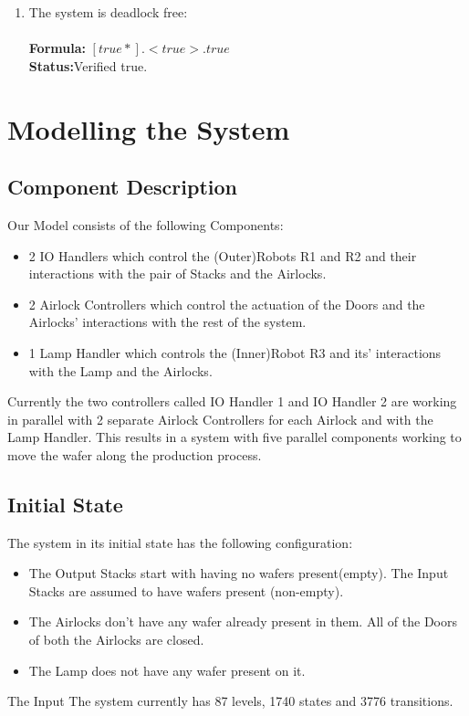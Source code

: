 \documentclass[a4paper,12pt]{article}
\begin{document}
\begin{enumerate}

\item The system is deadlock free:
\\
\\\textbf{Formula:} $[true*].<true>.true$
\\\textbf{Status:}Verified true.

\end{enumerate}

\newpage
\section{Modelling the System}
\subsection{Component Description}
Our Model consists of the following Components:
\begin{itemize}
    \item 2 IO Handlers which control the (Outer)Robots R1 and R2 and their interactions with the pair of Stacks and the Airlocks.
    \item 2 Airlock Controllers which control the actuation of the Doors and the Airlocks' interactions with the rest of the system.
    \item 1 Lamp Handler which controls the (Inner)Robot R3 and its' interactions with the Lamp and the Airlocks.
\end{itemize}
Currently the two controllers called IO Handler 1 and IO Handler 2 are working in parallel with 2 separate Airlock Controllers for each Airlock and with the Lamp Handler. This results in a system with five parallel components working to move the wafer along the production process. 
\subsection{Initial State}
The system in its initial state has the following configuration:
\begin{itemize}
    \item The Output Stacks start with having no wafers present(empty). The Input Stacks are assumed to have wafers present (non-empty).
    \item The Airlocks don't have any wafer already present in them. All of the Doors of both the Airlocks are closed.
    \item The Lamp does not have any wafer present on it.
\end{itemize} 
The Input The system currently has 87 levels, 1740 states and 3776 transitions.
\end{document}
